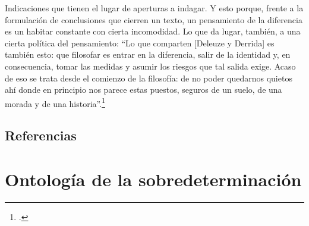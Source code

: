 Indicaciones que tienen el lugar de aperturas a indagar. Y esto porque, frente a la formulación de conclusiones que cierren un texto, un pensamiento de la diferencia es un habitar constante con cierta incomodidad. Lo que da lugar, también, a una cierta política del pensamiento: \enquote{Lo que comparten [Deleuze y Derrida] es también esto: que filosofar es entrar en la diferencia, salir de la identidad y, en consecuencia, tomar las medidas y asumir los riesgos que tal salida exige. Acaso de eso se trata desde el comienzo de la filosofía: de no poder quedarnos quietos ahí donde en principio nos parece estas puestos, seguros de un suelo, de una morada y de una historia}.\footcite[21]{@6986-NANCY2008}

\section*{Referencias}
\printbibliography[heading=none]

\chapter[\textbf{Andrés Daín}\\ Ontología de la sobredeterminación]{Ontología de la sobredeterminación} %

